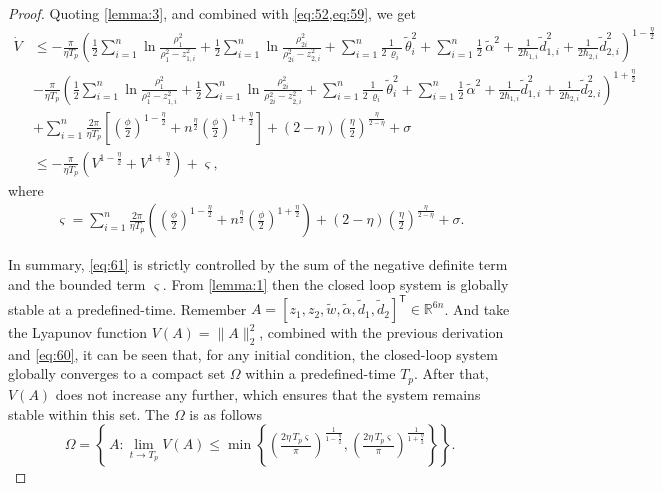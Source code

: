 \documentclass[pdflatex,sn-mathphys-num]{sn-jnl}%
\theoremstyle{thmstyleone}%
\theoremstyle{thmstyletwo}%
\theoremstyle{thmstylethree}%
\begin{document}
\begin{proof}
Quoting \cref{lemma:3}, and combined with \cref{eq:52,eq:59}, we get
\begin{equation}\label{eq:60}
	\begin{aligned}
		\dot{V}
		 & \le-\frac{\pi}{\eta T_{p}}\left(\frac{1}{2}\sum_{i=1}^{n} \ln\frac{\rho_{1}^2}{\rho_{1}^2-z_{1,i}^2}
		+ \frac{1}{2}\sum_{i=1}^{n} \ln\frac{\rho_{2i}^2}{\rho_{2i}^2-z_{2,i}^2}
		+ \sum_{i=1}^{n}\frac{1}{2\,\varrho_i}\,\tilde \theta_{i}^2+\sum_{i=1}^{n}\frac{1}{2}\,{\tilde{\alpha}}^2+\frac{1}{2\hbar_{1,i}}{\tilde d}^2_{1,i}+\frac{1}{2\hbar_{2,i}}{\tilde d}^2_{2,i}\right)^{1-\frac{\eta}{2}} \\
		 & -\frac{\pi }{\eta T_{p}}\left(\frac{1}{2}\sum_{i=1}^{n} \ln\frac{\rho_{1}^2}{\rho_{1}^2-z_{1,i}^2}
		+ \frac{1}{2}\sum_{i=1}^{n} \ln\frac{\rho_{2i}^2}{\rho_{2i}^2-z_{2,i}^2}
		+ \sum_{i=1}^{n}\frac{1}{2\,\varrho_i}\,\tilde \theta_{i}^2+\sum_{i=1}^{n}\frac{1}{2}\,{\tilde{\alpha}}^2+\frac{1}{2\hbar_{1,i}}{\tilde d}^2_{1,i}+\frac{1}{2\hbar_{2,i}}{\tilde d}^2_{2,i}\right)^{1+\frac{\eta}{2}} \\
		 & +\sum_{i=1}^{n}\frac{2\pi}{\eta T_{p}} \left[  \left(\frac{\phi}{2}\right)^{1-\frac{\eta}{2}} + n^{\frac\eta2}\left(\frac{\phi}{2}\right)^{1+\frac{\eta}{2}}  \right]+\left( 2-\eta\right) \left(\frac{\eta}{2}\right)^{\frac{\eta}{2-\eta}}+\sigma      \\
		 & \le-\frac{\pi}{\eta T_{p}}\left( V^{1-\frac{\eta}{2}}+V^{1+\frac{\eta}{2}}\right)+\varsigma    ,                                                                    
	\end{aligned}
\end{equation}
where
\begin{equation}\label{eq:61}
	\begin{aligned}
\varsigma =\sum_{i=1}^{n}\frac{2\pi}{\eta T_{p}} \left(  (\frac{\phi}{2})^{1-\frac{\eta}{2}} + n^{\frac\eta2}(\frac{\phi}{2})^{1+\frac{\eta}{2}}  \right)+\left( 2-\eta\right) \left(\frac{\eta}{2}\right)^{\frac{\eta}{2-\eta}}+\sigma.
		\end{aligned}
\end{equation}

In summary, \cref{eq:61} is strictly controlled by the sum of the negative definite term and the bounded term $\varsigma$. From \cref{lemma:1} then the closed loop system is globally stable at a predefined-time. Remember 
$A=\left[z_1, z_2,\tilde w,\tilde \alpha, {\tilde d}_{1}, {\tilde d}_{2}\right]^{\mathsf T} \in \mathbb{R}^{6n}$. And take the Lyapunov function $V(A)=\|A\|_2^2$, combined with the previous derivation and \cref{eq:60}, it can be seen that, for any initial condition, the closed-loop system globally converges to a compact set $\Omega$ within a predefined-time $T_p$. After that, $V(A)$ does not increase any further, which ensures that the system remains stable within this set. The $\Omega$ is as follows
\begin{equation}\label{eq:62}
	\Omega
	=\left\{\,A : \lim_{t\to T_p}V(A) \le
	\min\left\{
	\left(\tfrac{2\eta\,T_p \varsigma }{\pi}\right)^{\!{\frac{1}{1-\frac{\eta}{2}}}}\!,
	\left(\tfrac{2\eta\,T_p \varsigma }{\pi}\right)^{\!{\frac{1}{1+\frac{\eta}{2}}}}
	\right\}\right\}.
\end{equation}


\end{proof}
\end{document}
